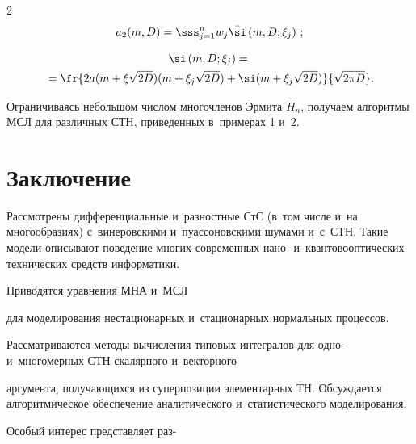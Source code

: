 \begin{multicols}{2}
\begin{gather*}
    a_2(m,D)=\sss_{j=1}^n w_j \bar\si \left( m, D;\xi_j\right)\,;

    \end{gather*}



    \vspace*{-12pt}



    \noindent

    \begin{multline*}

    \bar\si \left( m, D;\xi_j\right)={}\\

    {}=\fr{2a(m+\xi\sqrt{2D})(m+\xi_j\sqrt{2D}) +\si(m+\xi_j\sqrt{2D})}{\sqrt{2\pi D}}.

\end{multline*}

Ограничиваясь небольшом числом многочленов Эрмита $H_n$, получаем алгоритмы МСЛ для различных СТН, приведенных в~примерах 1 и~2.



\vspace*{-6pt}



\section{Заключение}



Рассмотрены  дифференциальные и~разностные СтС (в~том числе и~на многообразиях) с~винеровскими и~пуассоновскими шумами и~с~СТН. Такие модели описывают поведение многих современных нано- и~квантовооптических  технических средств информатики.

Приводятся уравнения МНА и~МСЛ\linebreak

 для моделирования нестационарных и~стационарных нормальных процессов.

Рассматриваются методы вычисления типовых интегралов для одно- и~многомерных  СТН скалярного и~векторного\linebreak

 аргумен\-та, получающихся из суперпозиции элементарных ТН. Обсуждается алгоритмическое обеспечение аналитического и~статистического мо\-делирования.

Особый интерес представляет раз-\linebreak\vspace*{-12pt}




\end{multicols}
